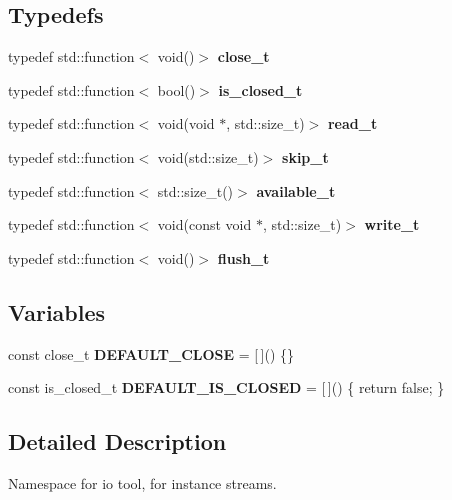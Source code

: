 \subsection*{Typedefs}
\begin{DoxyCompactItemize}
\item 
\mbox{\label{namespacedevfix_1_1base_1_1io_ae3118387742e5f4d484a328a213d6a5d}} 
typedef std\+::function$<$ void()$>$ {\bfseries close\+\_\+t}
\item 
\mbox{\label{namespacedevfix_1_1base_1_1io_a14f89d4437ced6ede49c044ee8e71f17}} 
typedef std\+::function$<$ bool()$>$ {\bfseries is\+\_\+closed\+\_\+t}
\item 
\mbox{\label{namespacedevfix_1_1base_1_1io_afa65222ee5a1636be18df5e16bbcf858}} 
typedef std\+::function$<$ void(void $\ast$, std\+::size\+\_\+t)$>$ {\bfseries read\+\_\+t}
\item 
\mbox{\label{namespacedevfix_1_1base_1_1io_aeb8f94d85cfeaa405f53a6967e609645}} 
typedef std\+::function$<$ void(std\+::size\+\_\+t)$>$ {\bfseries skip\+\_\+t}
\item 
\mbox{\label{namespacedevfix_1_1base_1_1io_a19c1195ab6a44e6d4f48b86062860a11}} 
typedef std\+::function$<$ std\+::size\+\_\+t()$>$ {\bfseries available\+\_\+t}
\item 
\mbox{\label{namespacedevfix_1_1base_1_1io_a75953e4d7f81d76e419f9672ffedda87}} 
typedef std\+::function$<$ void(const void $\ast$, std\+::size\+\_\+t)$>$ {\bfseries write\+\_\+t}
\item 
\mbox{\label{namespacedevfix_1_1base_1_1io_a622685976c7f503411827fba028d3ce1}} 
typedef std\+::function$<$ void()$>$ {\bfseries flush\+\_\+t}
\end{DoxyCompactItemize}
\subsection*{Variables}
\begin{DoxyCompactItemize}
\item 
\mbox{\label{namespacedevfix_1_1base_1_1io_a14a286c17d4b93881d42b1d14beb2d0b}} 
const close\+\_\+t {\bfseries D\+E\+F\+A\+U\+L\+T\+\_\+\+C\+L\+O\+SE} = \mbox{[}$\,$\mbox{]}() \{\}
\item 
\mbox{\label{namespacedevfix_1_1base_1_1io_ae04fec2a2a2db3482e624a59e59a2a14}} 
const is\+\_\+closed\+\_\+t {\bfseries D\+E\+F\+A\+U\+L\+T\+\_\+\+I\+S\+\_\+\+C\+L\+O\+S\+ED} = \mbox{[}$\,$\mbox{]}() \{ return false; \}
\end{DoxyCompactItemize}


\subsection{Detailed Description}
Namespace for io tool, for instance streams. 